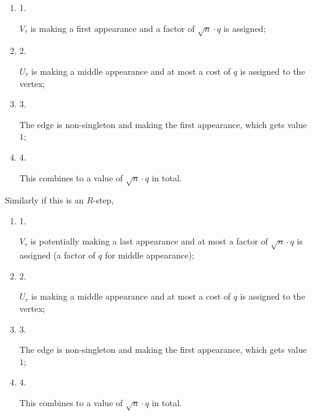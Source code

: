 \documentclass[10pt,a4paper]{article}
\begin{document}
\begin{enumerate}


\item[] 
1. 


$V_{\tau}$ is making a first appearance and a factor of $\sqrt{n}\cdot q$ is assigned;\par





\item[] 
2. 


$U_{\tau}$ is making a middle appearance and at most a cost of $q$ is assigned to the vertex;\par





\item[] 
3. 


The edge is non-singleton and making the first appearance, which gets value $1$;\par





\item[] 
4. 


This combines to a value of $\sqrt{n}\cdot q$ in total.\par





\end{enumerate}


Similarly if this is an $R$-step,\par


\begin{enumerate}


\item[] 
1. 


$V_{\tau}$ is potentially making a last appearance and at most a factor of $\sqrt{n}\cdot q$ is assigned (a factor of $q$ for middle appearance);\par





\item[] 
2. 


$U_{\tau}$ is making a middle appearance and at most a cost of $q$ is assigned to the vertex;\par





\item[] 
3. 


The edge is non-singleton and making the first appearance, which gets value $1$;\par





\item[] 
4. 


This combines to a value of $\sqrt{n}\cdot q$ in total.\par





\end{enumerate}
\end{document}
